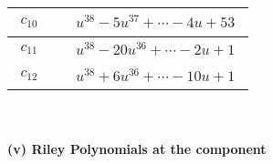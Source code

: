 \documentclass[1p]{elsarticle_modified}
\theoremstyle{definition}
\begin{document}
\begin{tabular}{m{50pt}|m{274pt}}
\hline $$\begin{aligned}c_{10}\end{aligned}$$&$\begin{aligned}
&u^{38}-5 u^{37}+\cdots-4 u+53
\end{aligned}$\\
\hline $$\begin{aligned}c_{11}\end{aligned}$$&$\begin{aligned}
&u^{38}-20 u^{36}+\cdots-2 u+1
\end{aligned}$\\
\hline $$\begin{aligned}c_{12}\end{aligned}$$&$\begin{aligned}
&u^{38}+6 u^{36}+\cdots-10 u+1
\end{aligned}$\\
\hline
\end{tabular}\\~\\
\newpage\renewcommand{\arraystretch}{1}
\flushleft \textbf{(v) Riley Polynomials at the component}\newline \\
\end{document}
